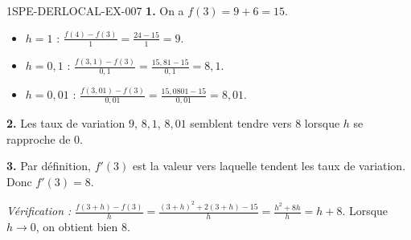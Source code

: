 \begin{corrige}{1SPE-DERLOCAL-EX-007}
\textbf{1.} On a $f(3)=9+6=15$.
\begin{itemize}
  \item $h=1$ : $\frac{f(4)-f(3)}{1}=\frac{24-15}{1}=9$.
  \item $h=0{,}1$ : $\frac{f(3{,}1)-f(3)}{0{,}1}=\frac{15{,}81-15}{0{,}1}=8{,}1$.
  \item $h=0{,}01$ : $\frac{f(3{,}01)-f(3)}{0{,}01}=\frac{15{,}0801-15}{0{,}01}=8{,}01$.
\end{itemize}

\textbf{2.} Les taux de variation $9$, $8{,}1$, $8{,}01$ semblent tendre vers $8$ lorsque $h$ se rapproche de $0$.

\textbf{3.} Par définition, $f'(3)$ est la valeur vers laquelle tendent les taux de variation. Donc $f'(3)=8$.

\textit{Vérification :} $\frac{f(3+h)-f(3)}{h}=\frac{(3+h)^2+2(3+h)-15}{h}=\frac{h^2+8h}{h}=h+8$. Lorsque $h\to 0$, on obtient bien $8$.
\end{corrige}
